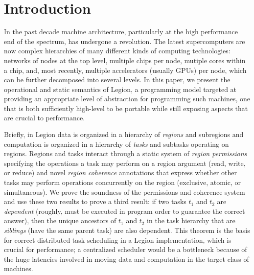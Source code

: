 
\section{Introduction}
\label{sec:intro}

In the past decade machine architecture, particularly at the high
performance end of the spectrum, has undergone a revolution.  The
latest supercomputers are now complex hierarchies of many different
kinds of computing technologies: networks of nodes at the top level,
multiple chips per node, mutiple cores within a chip, and, most
recently, multiple accelerators (usually GPUs) per node, which 
can be further decomposed into several levels.   In this paper, we present the operational and static
semantics of Legion, a programming model targeted at providing an
appropriate level of abstraction for programming such machines, one
that is both sufficiently high-level to be portable while still
exposing aspects that are crucial to performance. 

Briefly, in Legion data is organized in a hierarchy of {\em regions}
and subregions and computation is organized in a hierarchy of {\em
tasks} and subtasks operating on regions.  Regions and tasks interact
through a static system of {\em region permissions} specifying the
operations a task may perform on a region argument (read,
write, or reduce) and novel {\em region coherence} annotations that
express whether other tasks may perform operations concurrently on
the region (exclusive, atomic, or simultaneous).  We prove the
soundness of the permissions and coherence system and use these two
results to prove a third result: if two tasks $t_1$ and $t_2$ are {\em
dependent} (roughly, must be executed in program order to guarantee
the correct answer), then the unique ancestors of $t_1$ and $t_2$ in
the task hierarchy that are {\em siblings} (have the same parent task)
are also dependent.  This theorem is the basis for correct distributed
task scheduling in a Legion implementation, which is crucial for
performance; a centralized scheduler would be a bottleneck
because of the huge latencies involved in moving data and computation
in the target class of machines.

